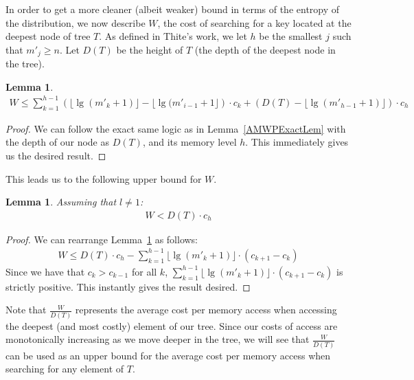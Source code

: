 \documentclass[letterpaper,12pt,titlepage,oneside,final]{book}
\theoremstyle{plain}
\newtheorem{lem}[thm]{Lemma}
\begin{document}
In order to get a more cleaner (albeit weaker) bound in terms of the entropy of the distribution, we now describe $W$, the cost of searching for a key located at the deepest node of tree $T$. As defined in Thite's work, we let $h$ be the smallest $j$ such that $m'_j \geq n$. Let $D(T)$ be the height of $T$ (the depth of the deepest node in the tree).

\begin{lem} \label{452}
\begin{align*}
W \leq \sum_{k=1}^{h-1} \left(\lfloor \lg(m'_k+1) \rfloor - \lfloor \lg(m'_{i-1}+1 \rfloor  \right)\cdot c_k+ \left(D(T) - \lfloor \lg(m'_{h-1}+1) \rfloor \right)\cdot c_h
\end{align*}
\end{lem}


\begin{proof}
We can follow the exact same logic as in Lemma~\ref{AMWPExactLem} with the depth of our node as $D(T)$, and its memory level $h$. This immediately gives us the desired result.

\end{proof}

This leads us to the following upper bound for $W$.

\begin{lem} \label{W<HT}
Assuming that $l \neq 1$:
\begin{align*}
W<D(T)\cdot c_h
\end{align*}
\end{lem}

\begin{proof}
We can rearrange Lemma~\ref{452} as follows:
\begin{align*}
W \leq D(T)\cdot c_h - \sum_{k=1}^{h-1} \lfloor \lg(m'_k+1) \rfloor \cdot(c_{k+1} - c_k) 
\end{align*}
Since we have that $c_k > c_{k-1}$ for all $k$, $\sum_{k=1}^{h-1} \lfloor \lg(m'_k+1) \rfloor \cdot(c_{k+1} - c_k)$ is strictly positive. This instantly gives the result desired.
\end{proof}

Note that $\frac{W}{D(T)}$ represents the average cost per memory access when accessing the deepest (and most costly) element of our tree. Since our costs of access are monotonically increasing as we move deeper in the tree, we will see that $\frac{W}{D(T)}$ can be used as an upper bound for the average cost per memory access when searching for any element of $T$.
\end{document}
